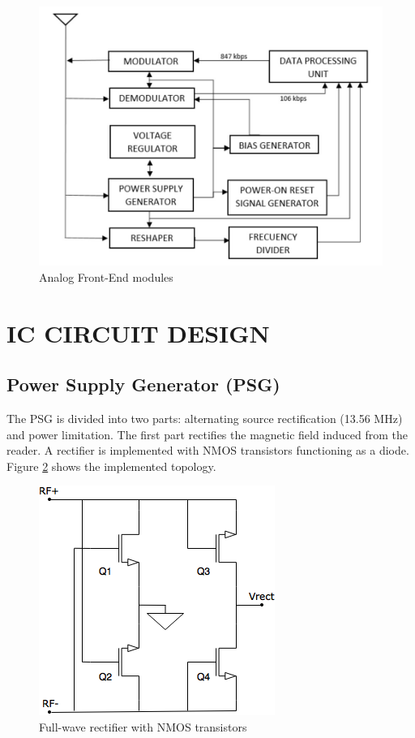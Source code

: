 \documentclass[a4paper, 10pt, conference]{ieeeconf}      %
\begin{document}
\begin{figure}[H]
\centering
\includegraphics[scale=0.3]{Images/ImagenesTesina/modulos_rfid.png}
\caption{Analog Front-End modules}
\label{fig:modulos_rfid}
\end{figure}


\section{IC CIRCUIT DESIGN}

\subsection{Power Supply Generator (PSG)}

The PSG is divided into two parts: alternating source rectification (13.56 MHz) and power limitation. The first part rectifies the magnetic field induced from the reader. A rectifier is implemented with NMOS transistors functioning as a diode. Figure \ref{fig:rectifier} shows the implemented topology.

\begin{figure}[H]
\centering
\includegraphics[scale=0.6]{Images/ImagenesTesina/circuitos/Rectifier.png}
\caption{Full-wave rectifier with NMOS transistors}
\label{fig:rectifier}
\end{figure}
\end{document}
